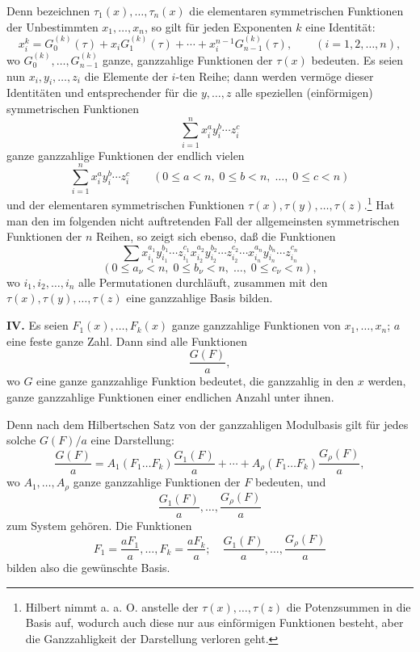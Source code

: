 \documentclass[11pt]{article}
\begin{document}
Denn bezeichnen \(\tau_1(x),\ldots,\tau_n(x)\) die elementaren symmetrischen Funktionen der Unbestimmten \(x_1,\ldots,x_n\), so gilt für jeden Exponenten \(k\) eine Identität:
\[
        x_i^k = G_0^{(k)}(\tau)+x_iG_1^{(k)}(\tau)+\cdots+x_i^{n-1}G_{n-1}^{(k)}(\tau),
        \qquad (i=1,2,\ldots,n),
\]
wo \(G_0^{(k)},\ldots,G_{n-1}^{(k)}\) ganze, ganzzahlige Funktionen der \(\tau(x)\) bedeuten. Es seien nun \(x_i,y_i,\ldots,z_i\) die Elemente der \(i\)-ten Reihe; dann werden vermöge dieser Identitäten und entsprechender für die \(y,\ldots,z\) alle speziellen (einförmigen) symmetrischen Funktionen
\[
        \sum_{i=1}^n x_i^{a}y_i^{b}\cdots z_i^{c}
\]
ganze ganzzahlige Funktionen der endlich vielen
\[
        \sum_{i=1}^n x_i^{a}y_i^{b}\cdots z_i^{c}
        \qquad
        (0\le a<n,\;0\le b<n,\;\ldots,\;0\le c<n)
\]
und der elementaren symmetrischen Funktionen \(\tau(x),\tau(y),\ldots,\tau(z)\).\footnote{Hilbert nimmt a. a. O. anstelle der \(\tau(x),\ldots,\tau(z)\) die Potenzsummen in die Basis auf, wodurch auch diese nur aus einförmigen Funktionen besteht, aber die Ganzzahligkeit der Darstellung verloren geht.}
Hat man den im folgenden nicht auftretenden Fall der allgemeinsten symmetrischen Funktionen der \(n\) Reihen, so zeigt sich ebenso, daß die Funktionen
\[
        \sum x_{i_1}^{a_1}y_{i_1}^{b_1}\cdots z_{i_1}^{c_1}
              x_{i_2}^{a_2}y_{i_2}^{b_2}\cdots z_{i_2}^{c_2}
              \cdots
              x_{i_n}^{a_n}y_{i_n}^{b_n}\cdots z_{i_n}^{c_n}
\]
\[
        (0\le a_\nu<n,\;0\le b_\nu<n,\;\ldots,\;0\le c_\nu<n),
\]
wo \(i_1,i_2,\ldots,i_n\) alle Permutationen durchläuft, zusammen mit den \(\tau(x),\tau(y),\ldots,\tau(z)\) eine ganzzahlige Basis bilden.

\textbf{IV.} Es seien \(F_1(x),\ldots,F_k(x)\) ganze ganzzahlige Funktionen von \(x_1,\ldots,x_n\); \(a\) eine feste ganze Zahl. Dann sind alle Funktionen
\[
        \frac{G(F)}{a},
\]
wo \(G\) eine ganze ganzzahlige Funktion bedeutet, die ganzzahlig in den \(x\) werden, ganze ganzzahlige Funktionen einer endlichen Anzahl unter ihnen.

Denn nach dem Hilbertschen Satz von der ganzzahligen Modulbasis gilt für jedes solche \(G(F)/a\) eine Darstellung:
\[
 \frac{G(F)}{a}
 =
 A_1(F_1\ldots F_k)\frac{G_1(F)}{a}
 +\cdots+
 A_\rho(F_1\ldots F_k)\frac{G_\rho(F)}{a},
\]
wo \(A_1,\ldots,A_\rho\) ganze ganzzahlige Funktionen der \(F\) bedeuten, und
\[
        \frac{G_1(F)}{a},\ldots,\frac{G_\rho(F)}{a}
\]
zum System gehören. Die Funktionen
\[
        F_1=\frac{aF_1}{a},\ldots,F_k=\frac{aF_k}{a};
        \quad
        \frac{G_1(F)}{a},\ldots,\frac{G_\rho(F)}{a}
\]
bilden also die gewünschte Basis.
\end{document}
